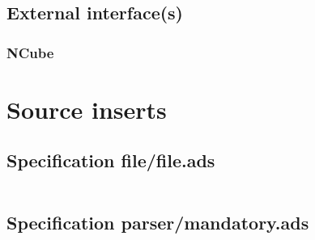 \documentclass[a4paper,10pt]{article}
\begin{document}
\subsection{External interface(s)}
\subsubsection{NCube}







\section{Source inserts}


\subsection{Specification file/file.ads}
\inputminted[linenos, fontsize=\footnotesize]{ada}{../lib/src/file/file.ads}

\subsection{Specification parser/mandatory.ads}
\inputminted[linenos, fontsize=\footnotesize]{ada}{../lib/src/parser/mandatory.ads}


\end{document}
